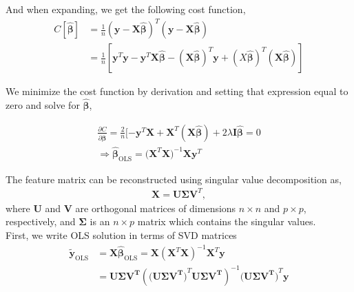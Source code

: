 \documentclass[a4paper,12pt]{article}
\begin{document}
 \noindent
And when expanding, we get the following cost function,
\begin{equation} \label{eq1}
\begin{split}
C[\boldsymbol{\hat{\beta}}]&=\frac{1}{n}(\boldsymbol{y}-\boldsymbol{X}\hat{\boldsymbol{\beta}})^T(\boldsymbol{y}-\boldsymbol{X}\hat{\boldsymbol{\beta}})\\
&=\frac{1}{n}[\boldsymbol{y}^T\boldsymbol{y}-\boldsymbol{y}^T\boldsymbol{X}\hat{\boldsymbol{\beta}}-(\boldsymbol{X}\hat{\boldsymbol{\beta}})^T\boldsymbol{y}+(X\hat{\boldsymbol{\beta}})^T(\boldsymbol{X}\hat{\boldsymbol{\beta}})]
\end{split}
\end{equation}

\noindent
We minimize the cost function by derivation and setting that expression equal to zero and solve for $\boldsymbol{\hat{\boldsymbol{\beta}}}$,

\begin{equation} \label{eq1}
\begin{split}
\frac{\partial C}{\partial \hat{\boldsymbol{\beta}}}=\frac{2}{n}[-\boldsymbol{y}^T\boldsymbol{X}+\boldsymbol{X}^T(\boldsymbol{X}\hat{\boldsymbol{\beta}})+2\lambda \boldsymbol{I}\hat{\boldsymbol{\beta}}=0 \\
\Rightarrow \boldsymbol{\hat{\boldsymbol{\beta}}}_{\mathrm{OLS}}=(\boldsymbol{X}^T\boldsymbol{X}\boldsymbol)^{-1}\boldsymbol{X}\boldsymbol{y}^T
\end{split}
\end{equation}

\noindent
The feature matrix can be reconstructed using singular value decomposition as,
\begin{equation} \label{eq1}
\begin{split}
\boldsymbol{X}=\boldsymbol{U}\boldsymbol{\Sigma}\boldsymbol{V}^T,
\end{split}
\end{equation}
where $\boldsymbol{U}$ and $\boldsymbol{V}$ are orthogonal matrices of dimensions
$n\times n$ and $p\times p$, respectively, and $\boldsymbol{\Sigma}$ is an
$n\times p$ matrix which contains the singular values.\\

\noindent
First, we write OLS solution in terms of SVD matrices
\begin{equation} \label{eq1}
\begin{split}
\tilde{\boldsymbol{y}}_{\mathrm{OLS}}&=\boldsymbol{X}\hat{\boldsymbol{\beta}}_{\mathrm{OLS}} = \boldsymbol{X}\left(\boldsymbol{X}^T\boldsymbol{X}\right)^{-1}\boldsymbol{X}^T\boldsymbol{y}\\
&= \boldsymbol{\boldsymbol{U}\boldsymbol{\Sigma}\boldsymbol{V}^T}\left(\boldsymbol{\big(\boldsymbol{U}\boldsymbol{\Sigma}\boldsymbol{V}^T\big)}^T\boldsymbol{\boldsymbol{U}\boldsymbol{\Sigma}\boldsymbol{V}^T}\right)^{-1}\boldsymbol{\big(\boldsymbol{U}\boldsymbol{\Sigma}\boldsymbol{V}^T\big)}^T\boldsymbol{y}
\end{split}
\end{equation}
\end{document}

